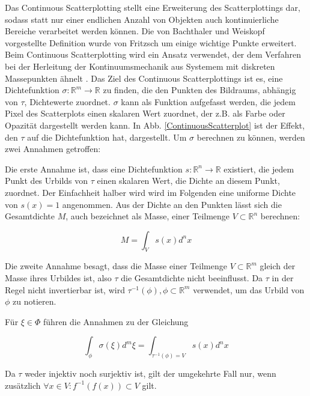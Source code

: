 \documentclass[a4paper,fontsize=12pt,toc=bib,halfparskip]{scrartcl}
\begin{document}
Das Continuous Scatterplotting stellt eine Erweiterung des Scatterplottings dar, sodass statt nur einer endlichen Anzahl von Objekten auch kontinuierliche Bereiche verarbeitet werden k\"onnen. Die von Bachthaler und Weiskopf\cite{bachthaler2008continuous} vorgestellte Definition wurde von Fritzsch\cite{fritzsch2016continuousScatterplot} um einige wichtige Punkte erweitert. Beim Continuous Scatterplotting wird ein Ansatz verwendet, der dem Verfahren bei der Herleitung der Kontinuumsmechanik aus Systemem mit diskreten Massepunkten \"ahnelt \cite[S.~1429]{bachthaler2008continuous}. Das Ziel des Continuous Scatterplottings ist es, eine Dichtefunktion $\sigma: \mathbb{R}^m \rightarrow \mathbb{R}$ zu finden, die den Punkten des Bildraums, abh\"angig von $\tau$, Dichtewerte zuordnet. $\sigma$ kann als Funktion aufgefasst werden, die jedem Pixel des Scatterplots einen skalaren Wert zuordnet, der z.B. als Farbe oder Opazit\"at dargestellt werden kann. In Abb. \ref{ContinuousScatterplot} ist der Effekt, den $\tau$ auf die Dichtefunktion hat, dargestellt. Um $\sigma$ berechnen zu k\"onnen, werden zwei Annahmen getroffen:

Die erste Annahme ist, dass eine Dichtefunktion $s: \mathbb{R}^n \rightarrow \mathbb{R}$ existiert, die jedem Punkt des Urbilds von $\tau$ einen skalaren Wert, die Dichte an diesem Punkt, zuordnet. Der Einfachheit halber wird wird im Folgenden eine uniforme Dichte von $s(x) = 1$ angenommen. Aus der Dichte an den Punkten l\"asst sich die Gesamtdichte $M$, auch bezeichnet als Masse, einer Teilmenge $V\subset\mathbb{R}^n$ berechnen:

\begin{equation}
	M = \int_{V}s(x)d^nx
	\label{Dichtefunktion}
\end{equation}

Die zweite Annahme besagt, dass die Masse einer Teilmenge $V\subset\mathbb{R}^m$ gleich der Masse ihres Urbildes ist, also $\tau$ die Gesamtdichte nicht beeinflusst. Da $\tau$ in der Regel nicht invertierbar ist, wird $\tau^{-1}(\phi), \phi \subset \mathbb{R}^m$ verwendet, um das Urbild von $\phi$ zu notieren. 


F\"ur $\xi \in \Phi$ f\"uhren die Annahmen zu der Gleichung

\begin{equation}
	\int_{\phi}\sigma(\xi)d^m\xi = \int_{\tau^{-1}(\phi) = V}s(x)d^nx
\end{equation}

Da $\tau$ weder injektiv noch surjektiv ist, gilt der umgekehrte Fall nur, wenn zus\"atzlich $\forall x \in V: f^{-1}(f(x)) \subset V$ gilt\cite [S.~20]{fritzsch2016continuousScatterplot}.
\end{document}
